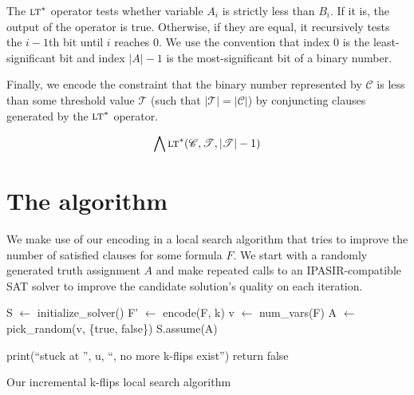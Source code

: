 \documentclass{article}
\begin{document}
\noindent The $\textsc{lt}^*$ operator tests whether variable $A_i$ is strictly
less than $B_i$. If it is, the output of the operator is true. Otherwise, if
they are equal, it recursively tests the $i - 1$th bit until $i$ reaches $0$. We
use the convention that index $0$ is the least-significant bit and index $\vert
A \vert - 1$ is the most-significant bit of a binary number.

Finally, we encode the constraint that the binary number represented by
$\mathscr{C}$ is less than some threshold value $\mathscr{T}$ (such that  $\vert
\mathscr{T} \vert = \vert \mathscr{C} \vert$) by conjuncting clauses generated
by the $\textsc{lt}^*$ operator.

\begin{equation}
  \bigwedge \textsc{lt}^*(\mathscr{C}, \mathscr{T}, \vert \mathscr{T} \vert - 1)
\end{equation}

\break

\section{The algorithm}

We make use of our encoding in a local search algorithm that tries to improve
the number of satisfied clauses for some formula $F$. We start with a randomly
generated truth assignment $A$ and make repeated calls to an IPASIR-compatible
SAT solver to improve the candidate solution's quality on each iteration. \\

\begin{algorithm}[H]
\SetAlgoLined
\DontPrintSemicolon

  \;

  S $\gets$ initialize\_solver()\;
  F' $\gets$ encode(F, k)\;
  v $\gets$ num\_vars(F)\;
  A $\gets$ pick\_random(v, \{true, false\})\;
  S.assume(A)\;
  \;

 \;
   {
    print(“stuck at ”, u, “, no more k-flips exist”)\;
    return false
  }
 \caption{Our incremental k-flips local search algorithm}
\end{algorithm} \vspace{5mm}
\end{document}

